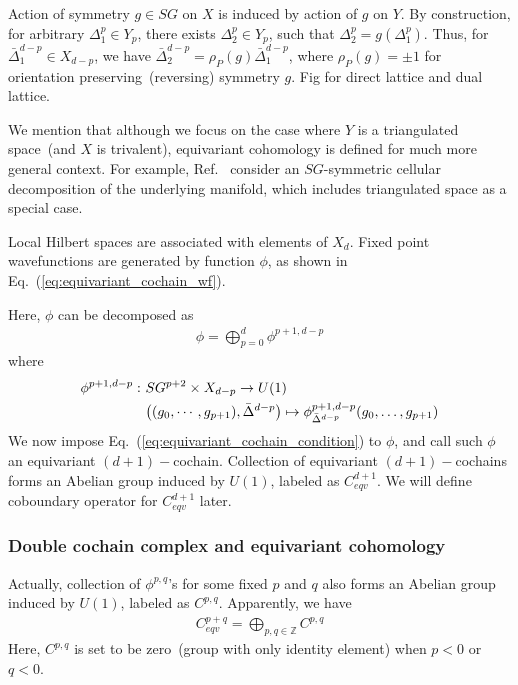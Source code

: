 \documentclass[reprint,amsmath,amssymb,aps,pra,]{revtex4-1}
\newcommand{\ZZ}{\mathbb{Z}} %
\begin{document}
Action of symmetry $g\in SG$ on $X$ is induced by action of $g$ on $Y$.
By construction, for arbitrary $\Delta^p_1\in Y_p$, there exists $\Delta^p_2\in Y_p$, such that $\Delta^p_2=g(\Delta^p_1)$.
Thus, for $\bar{\Delta}^{d-p}_1\in X_{d-p}$, we have $\bar{\Delta}_2^{d-p}=\rho_P(g)\bar{\Delta}^{d-p}_1$, where $\rho_P(g)=\pm1$ for orientation preserving~(reversing) symmetry $g$.
{\color{red} Fig for direct lattice and dual lattice.}

We mention that although we focus on the case where $Y$ is a triangulated space~(and $X$ is trivalent), equivariant cohomology is defined for much more general context. 
For example, Ref.~\cite{SongFangQi2018SongFangQi2018,ElseThorngren2018crystalline} consider an $SG$-symmetric cellular decomposition of the underlying manifold, which includes triangulated space as a special case.

Local Hilbert spaces are associated with elements of $X_d$. 
Fixed point wavefunctions are generated by function $\phi$, as shown in Eq.~(\ref{eq:equivariant_cochain_wf}).

Here, $\phi$ can be decomposed as
\begin{align}
  \phi=\bigoplus_{p=0}^d\phi^{p+1,d-p}
  \label{}
\end{align}
where
\begin{align}
  \phi^{p+1,d-p}:~&SG^{p+2}\times X_{d-p}\rightarrow U(1)\notag\\
  &\big((g_0,\cdots,g_{p+1}),\bar{\Delta}^{d-p}\big) \mapsto \phi^{p+1,d-p}_{\bar{\Delta}^{d-p}}(g_0,\ldots,g_{p+1})
  \label{}
\end{align}
We now impose Eq.~(\ref{eq:equivariant_cochain_condition}) to $\phi$, and call such $\phi$ an equivariant $(d+1)-$cochain. 
Collection of equivariant $(d+1)-$cochains forms an Abelian group induced by $U(1)$, labeled as $C^{d+1}_{eqv}$. 
We will define coboundary operator for $C^{d+1}_{eqv}$ later.

\subsubsection{Double cochain complex and equivariant cohomology}
Actually, collection of $\phi^{p,q}$'s for some fixed $p$ and $q$ also forms an Abelian group induced by $U(1)$, labeled as $C^{p,q}$.
Apparently, we have
\begin{align}
  C^{p+q}_{eqv}=\bigoplus_{p,q\in\ZZ} C^{p,q}
  \label{}
\end{align}
Here, $C^{p,q}$ is set to be zero~(group with only identity element) when $p<0$ or $q<0$.
\end{document}
